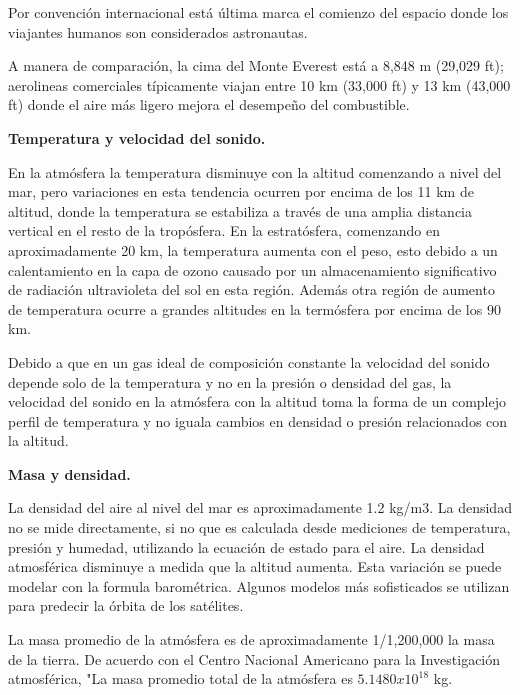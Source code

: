 \documentclass{article} %
\begin{document}
    Por convención internacional está última marca el comienzo del espacio donde los viajantes humanos son considerados astronautas. 
\vspace{0.5 cm}
   
	A manera de comparación, la cima del Monte Everest está a 8,848 m (29,029 ft); aerolineas comerciales típicamente viajan entre 10 km (33,000 ft) y 13 km (43,000 ft) donde el aire más ligero mejora el desempeño del combustible.
\vspace{0.5 cm}

\textbf{Temperatura y velocidad del sonido. }
\vspace{0.5 cm}

	En la atmósfera la temperatura disminuye con la altitud comenzando a nivel del mar, pero variaciones en esta tendencia ocurren por encima de los 11 km de altitud, donde la temperatura se estabiliza a través de una amplia distancia vertical en el resto de la tropósfera. En la estratósfera, comenzando en aproximadamente 20 km, la temperatura aumenta con el peso, esto debido a un calentamiento en la capa de ozono causado por un almacenamiento significativo de radiación ultravioleta del sol en esta región. Además otra región de aumento de temperatura ocurre a grandes altitudes en la termósfera por encima de los 90 km.
\vspace{0.5 cm}

	Debido a que en un gas ideal de composición constante la velocidad del sonido depende solo de la temperatura y no en la presión o densidad del gas, la velocidad del sonido en la atmósfera con la altitud toma la forma de un complejo perfil de temperatura y no iguala cambios en densidad o presión relacionados con la altitud. 
\vspace{0.5 cm}

\textbf{Masa y densidad.}
\vspace{0.5 cm}

La densidad del aire al nivel del mar es aproximadamente 1.2 kg/m3. La densidad no se mide directamente, si no que es calculada desde mediciones de temperatura, presión y humedad, utilizando la ecuación de estado para el aire. La densidad atmosférica disminuye a medida que la altitud aumenta. Esta variación se puede modelar con la formula barométrica. Algunos modelos más sofisticados se utilizan para predecir la órbita de los satélites. 
\vspace{0.5 cm}

La masa promedio de la atmósfera es de aproximadamente 1/1,200,000 la masa de la tierra. De acuerdo con el Centro Nacional Americano para la Investigación atmosférica, "La masa promedio total de la atmósfera es $5.1480x10^{18}$ kg.
\end{document}
